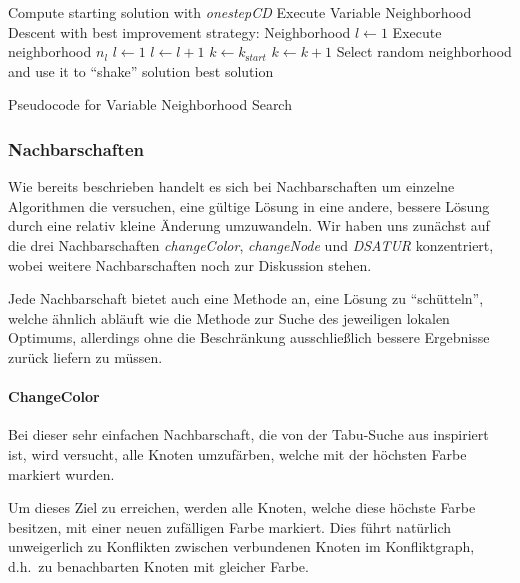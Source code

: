 \documentclass[paper=a4,fontsize=12pt]{scrartcl}
\begin{document}
{\begin{algorithm}
\begin{algorithmic}[1]
\State Compute starting solution with \emph{onestepCD}
\State Execute Variable Neighborhood Descent with best improvement strategy:
\State Neighborhood $l \leftarrow 1$
\State Execute neighborhood $n_l$
\State  $l\leftarrow 1$  
\Else
\State  $l\leftarrow l + 1$
\EndIf
\EndWhile
{}
\State $k \leftarrow k_{\mathrm start}$ 
\Else
\State $k \leftarrow k + 1$
\EndIf
\State Select random neighborhood and use it to ``shake'' solution
\EndWhile
\State\Return best solution
\end{algorithmic}
\caption{Pseudocode for Variable Neighborhood Search}
\end{algorithm}
}

\subsubsection{Nachbarschaften}
\label{sec:neigh}
Wie bereits beschrieben handelt es sich bei Nachbarschaften um einzelne Algorithmen die versuchen, eine gültige Lösung in eine andere, bessere Lösung durch eine relativ kleine Änderung umzuwandeln. Wir haben uns zunächst auf die drei Nachbarschaften \emph{changeColor}, \emph{changeNode} und \emph{DSATUR} konzentriert, wobei weitere Nachbarschaften noch zur Diskussion stehen.

Jede Nachbarschaft bietet auch eine Methode an, eine Lösung zu ``schütteln'', welche ähnlich abläuft wie die Methode zur Suche des jeweiligen lokalen Optimums, allerdings ohne die Beschränkung ausschließlich bessere Ergebnisse zurück liefern zu müssen.

\paragraph{ChangeColor}
Bei dieser sehr einfachen Nachbarschaft, die von der Tabu-Suche aus \citet*{Noronha2006} inspiriert ist, wird versucht, alle Knoten umzufärben, welche mit der höchsten Farbe markiert wurden. 

Um dieses Ziel zu erreichen, werden alle Knoten, welche diese höchste Farbe besitzen, mit einer neuen zufälligen Farbe markiert. Dies führt natürlich unweigerlich zu Konflikten zwischen verbundenen Knoten im Konfliktgraph, d.h.\ zu benachbarten Knoten mit gleicher Farbe. 
\end{document}
